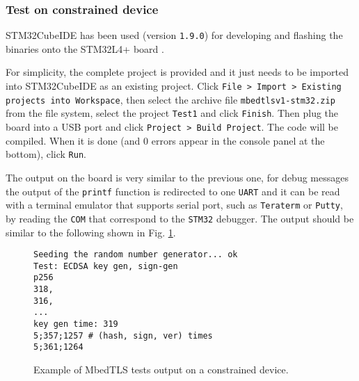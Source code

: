 \subsubsection{Test on constrained device}
STM32CubeIDE \cite{cube-ide} has been used (version \texttt{1.9.0}) for developing and flashing the binaries onto the STM32L4+ board \cite{stm32-board-product}.

For simplicity, the complete project is provided and it just needs to be imported into STM32CubeIDE as an existing project. Click \texttt{File > Import > Existing projects into Workspace}, then select the archive file \texttt{mbedtlsv1-stm32.zip} from the file system, select the project \texttt{Test1} and click \texttt{Finish}. Then plug the board into a USB port and click \texttt{Project > Build Project}. The code will be compiled. When it is done (and 0 errors appear in the console panel at the bottom), click \texttt{Run}. 

The output on the board is very similar to the previous one, for debug messages the output of the \texttt{printf} function is redirected to one \texttt{UART} and it can be read with a terminal emulator that supports serial port, such as \texttt{Teraterm} or \texttt{Putty}, by reading the \texttt{COM} that correspond to the \texttt{STM32} debugger. 
The output should be similar to the following shown in Fig. \ref{l-mbedtls-2}. \\
\begin{figure}[H]
\begin{lstlisting}[frame=single]
Seeding the random number generator... ok
Test: ECDSA key gen, sign-gen
p256
318,
316,
...
key gen time: 319
5;357;1257 # (hash, sign, ver) times
5;361;1264
\end{lstlisting}
\caption{Example of MbedTLS tests output on a constrained device. \label{l-mbedtls-2}}
\end{figure}




